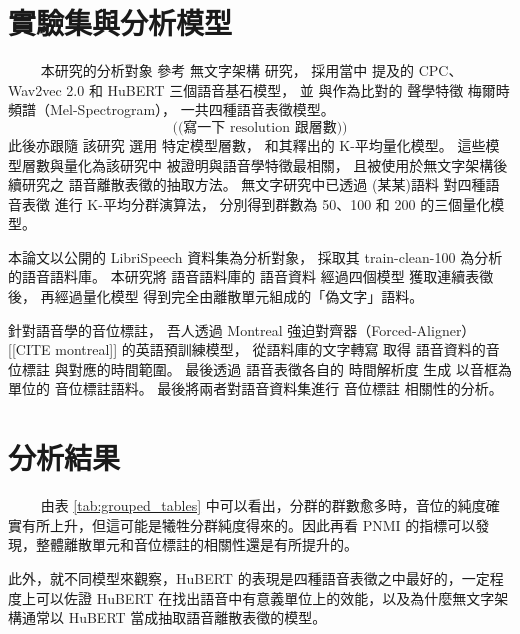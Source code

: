 
\section{實驗集與分析模型}
　　
本研究的分析對象
參考
無文字架構 \cite{noauthor_textless_2021, lakhotia_generative_2021, lakhotia_generative_2021-1}  
研究，
採用當中
提及的 CPC、Wav2vec 2.0 和 HuBERT 三個語音基石模型，
並
與作為比對的
聲學特徵
梅爾時頻譜（Mel-Spectrogram），
一共四種語音表徵模型。
$$
\text{((寫一下 resolution 跟層數))}
$$
此後亦跟隨
該研究
選用
特定模型層數，
和其釋出的
K-平均量化模型。
這些模型層數與量化為該研究中
被證明與語音學特徵最相關，
且被使用於無文字架構後續研究之
語音離散表徵的抽取方法。
無文字研究中已透過
(某某)語料
對四種語音表徵
進行 K-平均分群演算法，
分別得到群數為 50、100 和 200 的三個量化模型。

本論文以公開的 LibriSpeech 資料集為分析對象，
採取其 train-clean-100 為分析的語音語料庫。
本研究將
語音語料庫的
語音資料
經過四個模型
獲取連續表徵後，
再經過量化模型
得到完全由離散單元組成的「偽文字」語料。

針對語音學的音位標註，
吾人透過 Montreal 強迫對齊器（Forced-Aligner） [[CITE montreal]]
的英語預訓練模型，
從語料庫的文字轉寫
取得
語音資料的音位標註
與對應的時間範圍。
最後透過
語音表徵各自的
時間解析度
生成
以音框為單位的
音位標註語料。
最後將兩者對語音資料集進行
音位標註
相關性的分析。



\section{分析結果}



　　
由表 \ref{tab:grouped_tables} 中可以看出，分群的群數愈多時，音位的純度確實有所上升，但這可能是犧牲分群純度得來的。因此再看 PNMI 的指標可以發現，整體離散單元和音位標註的相關性還是有所提升的。

此外，就不同模型來觀察，HuBERT 的表現是四種語音表徵之中最好的，一定程度上可以佐證 HuBERT 在找出語音中有意義單位上的效能，以及為什麼無文字架構通常以 HuBERT 當成抽取語音離散表徵的模型。


